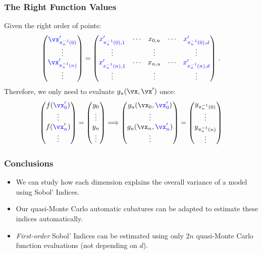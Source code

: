 \documentclass[11pt,compress]{beamer} %
\begin{document}
\begin{frame}
\frametitle{The Right Function Values}
Given the right order of points:
\begin{equation*}
\begin{pmatrix}
{\color{blue}\vx'_{\pi^{-1}_u(0)}} \\
\vdots \\
{\color{blue}\vx'_{\pi^{-1}_u(n)}} \\
\vdots
\end{pmatrix}=
\begin{pmatrix}
{\color{blue}x'_{\pi^{-1}_u(0),1}} & \cdots & {x_{0,u}} & \cdots & {\color{blue}x'_{\pi^{-1}_u(0),d}} \\
\vdots & & \vdots & & \vdots \\
{\color{blue}x'_{\pi^{-1}_u(n),1}} & \cdots & x_{n,u} & \cdots & {\color{blue}x'_{\pi^{-1}_u(n),d}} \\
\vdots & & \vdots & & \vdots
\end{pmatrix}\, .
\end{equation*}
Therefore, we only need to evaluate $g_u(\vx,\vx')$ once:
\begin{equation*}
\begin{pmatrix}
f({\color{blue}\vx'_{0}}) \\
\vdots \\
f({\color{blue}\vx'_{n}}) \\
\vdots
\end{pmatrix}=
\begin{pmatrix}
y_{0} \\
\vdots \\
y_{n} \\
\vdots
\end{pmatrix} \Longrightarrow
\begin{pmatrix}
g_u(\vx_0,{\color{blue}\vx'_0})\\
\vdots\\
g_u(\vx_n,{\color{blue}\vx'_n})\\
\vdots\\
\end{pmatrix}=
\begin{pmatrix}
y_{\pi^{-1}_u(0)} \\
\vdots \\
y_{\pi^{-1}_u(n)} \\
\vdots
\end{pmatrix}
\end{equation*}
\end{frame}

\begin{frame}
\frametitle{Conclusions}
\begin{itemize}
\item We can study how each \alert{dimension explains the overall variance} of a model using \alert{Sobol' Indices}.
\item Our \alert{quasi-Monte Carlo automatic cubatures} can be adapted to estimate these indices automatically.
\item \alert{\emph{First-order} Sobol' Indices} can be estimated using only \alert{$2n$ quasi-Monte Carlo} function evaluations (not depending on $d$).

\end{itemize}
\end{frame}
\end{document}
